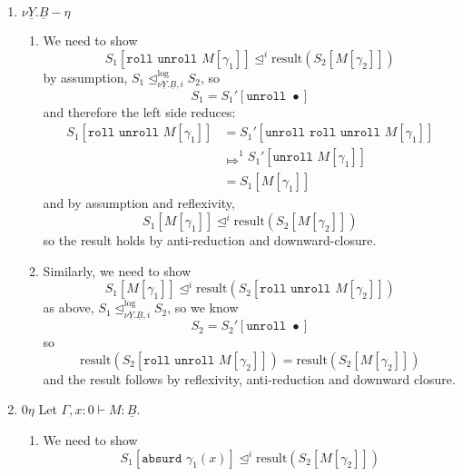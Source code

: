 \documentclass[acmsmall,screen,12pt]{acmart}
\renewcommand{\u}{\underline}
\newcommand{\apreorder}{\trianglelefteq}
\newcommand{\ix}[2]{\mathrel{#1^{#2}}}
\newcommand{\itylrof}[3]{\ilrof{#1}{#3,#2}}
\newcommand{\ilrof}[2]{\mathrel{{#1}^{\text{log}}_{#2}}}
\newcommand{\itylr}[2]{\itylrof{\apreorder}{#1}{#2}}
\newcommand{\bigstepsin}[1]{\mathrel{\Mapsto^{#1}}}
\newcommand{\roll}{\kw{roll}}
\newcommand{\rollty}[1]{\texttt{roll}_{#1}\,\,}
\newcommand{\unroll}{\kw{unroll}}
\newcommand{\result}{\text{result}}
\newcommand{\kw}[1]{\texttt{#1}\,\,}
\newcommand{\absurd}{\kw{absurd}}
\begin{document}
{\begin{longproof}
\begin{enumerate}
\begin{enumerate}
      \[ S_1[\unroll \rollty{\nu \u Y. \u B} M[\gamma_1]] \ix\apreorder i
      \result(S_2[M[\gamma_2]]) \]
      By the operational semantics,
      \[ S_1[\unroll \rollty{\nu \u Y. \u B} M[\gamma_1]] \bigstepsin{1} S_1[M[\gamma_1]] \]
      and by reflexivity and assumptions
      \[ S_1[M[\gamma_1]] \ix\apreorder {i} S_2[M[\gamma_2]] \]
      so the result follows by anti-reduction and downward closure.
    \item We need to show
      \[ S_1[M[\gamma_1]] \ix\apreorder i \result(S_2[\unroll \rollty{\nu \u Y. \u B} M[\gamma_2]]) \]
      By the operational semantics and invariance of result under reduction this is equivalent to
      \[ S_1[M[\gamma_1]] \ix\apreorder i \result(S_2[M[\gamma_2]]) \]
      which follows by assumption.
    \end{enumerate}
  \item $\nu \u Y. \u B-\eta$
    \begin{enumerate}
    \item We need to show
      \[ S_1[\roll \unroll M[\gamma_1]] \ix\apreorder i \result(S_2[M[\gamma_2]]) \]
      by assumption, $S_1 \itylr i {\nu \u Y.\u B} S_2$, so
      \[ S_1 = S_1'[\unroll \bullet] \]
      and therefore the left side reduces:
      \begin{align*}
         S_1[\roll \unroll M[\gamma_1]]
         &= S_1'[\unroll\roll\unroll M[\gamma_1]]\\
         &\bigstepsin{1} S_1'[\unroll M[\gamma_1]]\\
         &= S_1[M[\gamma_1]]
      \end{align*}
      and by assumption and reflexivity,
      \[ S_1[M[\gamma_1]] \ix\apreorder i \result(S_2[M[\gamma_2]]) \]
      so the result holds by anti-reduction and downward-closure.
    \item Similarly, we need to show
      \[ S_1[M[\gamma_1]] \ix\apreorder i \result(S_2[\roll\unroll M[\gamma_2]])\]
      as above, $S_1 \itylr i {\nu \u Y.\u B} S_2$, so we know
      \[ S_2 = S_2'[\unroll\bullet] \]
      so
      \[ \result(S_2[\roll\unroll M[\gamma_2]]) = \result(S_2[M[\gamma_2]])\]
      and the result follows by reflexivity, anti-reduction and downward closure.
    \end{enumerate}
  \item $0\eta$ Let $\Gamma, x : 0 \vdash M : \u B$.
    \begin{enumerate}
    \item We need to show
      \[ S_1[\absurd \gamma_1(x)] \ix\apreorder i \result(S_2[M[\gamma_2]])\]

\end{enumerate}
\end{enumerate}
\end{longproof}}
\end{document}
